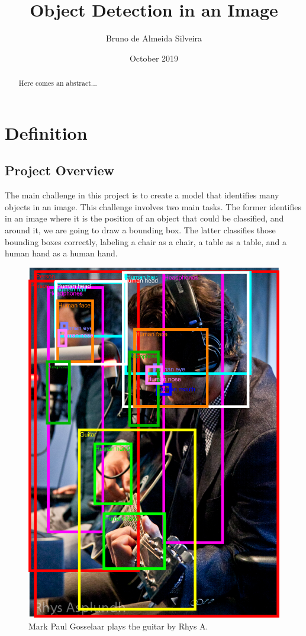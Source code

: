 \documentclass[11pt, a4paper, onecolumn]{article}
\title{\textbf{Object Detection in an Image}}
\author{Bruno de Almeida Silveira}
\date{October 2019}
\begin{document}
\begin{titlingpage}
	\maketitle
	\begin{abstract}
		Here comes an abstract...
	\end{abstract}
\end{titlingpage}

\section{Definition}
\subsection{Project Overview}
The main challenge in this project is to create a model that identifies many objects in an image. This challenge involves two main tasks. The former identifies in an image where it is the position of an object that could be classified, and around it, we are going to draw a bounding box. The latter classifies those bounding boxes correctly, labeling a chair as a chair, a table as a table, and a human hand as a human hand.

\begin{figure}[ht]
	\centering
	\includegraphics[width=.7\textwidth]{intro-1.png}
	\caption{\scriptsize Mark Paul Gosselaar plays the guitar by Rhys A. \cite{google:1}}
\end{figure}
\end{document}
